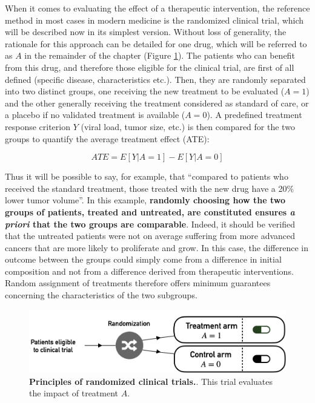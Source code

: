 \documentclass[a4paper,12pt,twoside,onecolumn,openright,final,oldfontcommands]{memoir}
\begin{document}
When it comes to evaluating the effect of a therapeutic intervention,
the reference method in most cases in modern medicine is the randomized
clinical trial, which will be described now in its simplest version.
Without loss of generality, the rationale for this approach can be
detailed for one drug, which will be referred to as \(A\) in the
remainder of the chapter (Figure \ref{fig:trials}). The patients who can
benefit from this drug, and therefore those eligible for the clinical
trial, are first of all defined (specific disease, characteristics
etc.). Then, they are randomly separated into two distinct groups, one
receiving the new treatment to be evaluated (\(A=1\)) and the other
generally receiving the treatment considered as standard of care, or a
placebo if no validated treatment is available (\(A=0\)). A predefined
treatment response criterion \(Y\) (viral load, tumor size, etc.) is
then compared for the two groups to quantify the average treatment
effect (ATE):

\[ATE= E[Y|A=1]-E[Y|A=0]\]

Thus it will be possible to say, for example, that ``compared to
patients who received the standard treatment, those treated with the new
drug have a 20\% lower tumor volume''. In this example, \textbf{randomly
choosing how the two groups of patients, treated and untreated, are
constituted ensures \emph{a priori} that the two groups are comparable}.
Indeed, it should be verified that the untreated patients were not on
average suffering from more advanced cancers that are more likely to
proliferate and grow. In this case, the difference in outcome between
the groups could simply come from a difference in initial composition
and not from a difference derived from therapeutic interventions. Random
assignment of treatments therefore offers minimum guarantees concerning
the characteristics of the two subgroups.

\begin{figure}

{\centering \includegraphics[width=0.9\linewidth]{fig/trials} 

}

\caption[Principles of randomized clinical]{\textbf{Principles of randomized clinical trials.}.
This trial evaluates the impact of treatment \(A\).}\label{fig:trials}
\end{figure}
\end{document}
